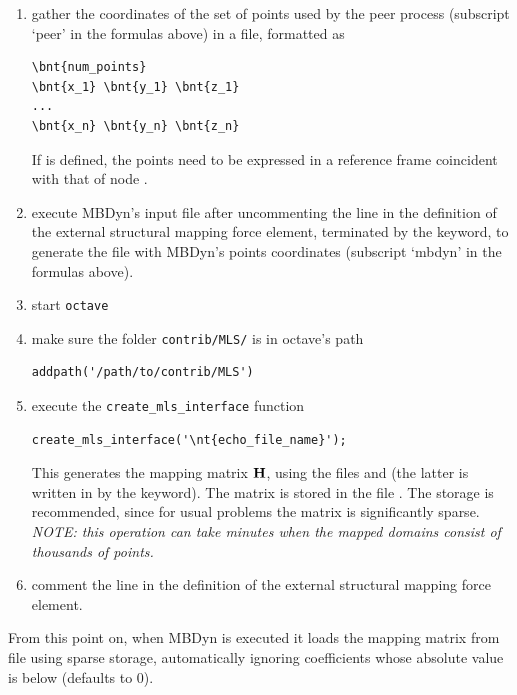 \begin{enumerate}
\item gather the coordinates of the set of points used by the peer process
(subscript `peer' in the formulas above) in a file, formatted as
\begin{Verbatim}[commandchars=\\\{\}]
\bnt{num_points}
\bnt{x_1} \bnt{y_1} \bnt{z_1}
...
\bnt{x_n} \bnt{y_n} \bnt{z_n}
\end{Verbatim}
If  is defined, the points need to be expressed
in a reference frame coincident with that of node .

\item execute MBDyn's input file after uncommenting the  line
in the definition of the external structural mapping force element,
terminated by the  keyword, to generate the 
file with MBDyn's points coordinates (subscript `mbdyn' in the formulas above).

\item start \texttt{octave}

\item make sure the folder \texttt{contrib/MLS/} is in octave's path
\begin{Verbatim}[commandchars=\\\{\}]
    addpath('/path/to/contrib/MLS')
\end{Verbatim}

\item execute the \texttt{create\_mls\_interface} function
\begin{Verbatim}[commandchars=\\\{\}]
    create_mls_interface('\nt{echo_file_name}');
\end{Verbatim}
This generates the mapping matrix $\bm{\mathbf H}$, using the files 
and  (the latter is written in 
by the  keyword). The matrix is stored in the file .
The  storage is recommended, since for usual problems
the matrix is significantly sparse.
\\
\emph{NOTE: this operation can take minutes when the mapped domains consist
of thousands of points.}

\item comment the  line
in the definition of the external structural mapping force element.
\end{enumerate}
From this point on, when MBDyn is executed it loads the mapping matrix
from file  using sparse storage, automatically
ignoring coefficients whose absolute value is below 
(defaults to 0).

